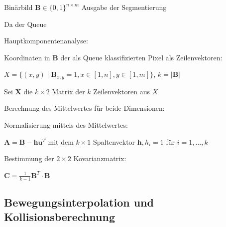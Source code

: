 Binärbild $\textbf{B} \in \{0, 1\}^{n\times m}$ Ausgabe der Segmentierung

Da der Queue 

Hauptkomponentenanalyse:

Koordinaten in $\textbf{B}$ der als Queue klassifizierten Pixel als Zeilenvektoren:

$X = \{(x, y) \mid \textbf{B}_{x,y} = 1, x \in [1,n], y \in [1,m]\}$, $k = |\textbf{B}|$

Sei $\textbf{X}$ die $k\times 2$ Matrix der $k$ Zeilenvektoren aus $X$

Berechnung des Mittelwertes für beide Dimensionen:

Normalisierung mittels des Mittelwertes:

$\textbf{A} = \textbf{B} - \textbf{h}\textbf{u}^{T}$ mit dem $k\times 1$ Spaltenvektor $\textbf{h}, h_i = 1$ für $i = 1,\dots,k$

Bestimmung der $2\times2$ Kovarianzmatrix:

$\textbf{C} = \frac{1}{k-1} {\textbf{B}}^{T} \cdot \textbf{B}$





\subsection{Bewegungsinterpolation und Kollisionsberechnung}





